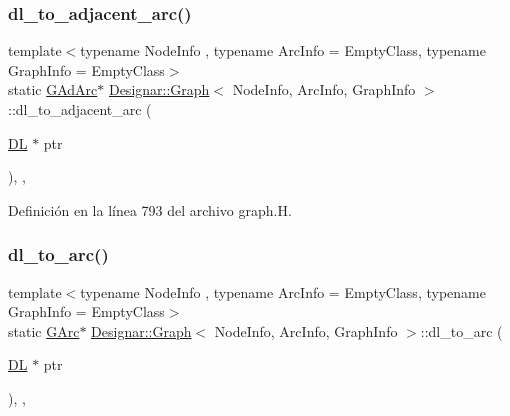 \mbox{\label{class_designar_1_1_graph_afb508b7f8616948cc46c33deddcfaa4c}} 
\subsubsection{\texorpdfstring{dl\+\_\+to\+\_\+adjacent\+\_\+arc()}{dl\_to\_adjacent\_arc()}}
{\footnotesize\ttfamily template$<$typename Node\+Info , typename Arc\+Info  = Empty\+Class, typename Graph\+Info  = Empty\+Class$>$ \\
static \hyperlink{class_designar_1_1_graph_a7d00558995946c5653522148b54971bc}{G\+Ad\+Arc}$\ast$ \hyperlink{class_designar_1_1_graph}{Designar\+::\+Graph}$<$ Node\+Info, Arc\+Info, Graph\+Info $>$\+::dl\+\_\+to\+\_\+adjacent\+\_\+arc (\begin{DoxyParamCaption}\item[{\hyperlink{class_designar_1_1_d_l}{DL} $\ast$}]{ptr }\end{DoxyParamCaption})\hspace{0.3cm}{\ttfamily [inline]}, {\ttfamily [static]}, {\ttfamily [protected]}}



Definición en la línea 793 del archivo graph.\+H.

\mbox{\label{class_designar_1_1_graph_a543b3279c059a0ee596a56a704ab7825}} 
\subsubsection{\texorpdfstring{dl\+\_\+to\+\_\+arc()}{dl\_to\_arc()}}
{\footnotesize\ttfamily template$<$typename Node\+Info , typename Arc\+Info  = Empty\+Class, typename Graph\+Info  = Empty\+Class$>$ \\
static \hyperlink{class_designar_1_1_graph_a5ad9e18b71899c2d4979426e367e5573}{G\+Arc}$\ast$ \hyperlink{class_designar_1_1_graph}{Designar\+::\+Graph}$<$ Node\+Info, Arc\+Info, Graph\+Info $>$\+::dl\+\_\+to\+\_\+arc (\begin{DoxyParamCaption}\item[{\hyperlink{class_designar_1_1_d_l}{DL} $\ast$}]{ptr }\end{DoxyParamCaption})\hspace{0.3cm}{\ttfamily [inline]}, {\ttfamily [static]}, {\ttfamily [protected]}}



